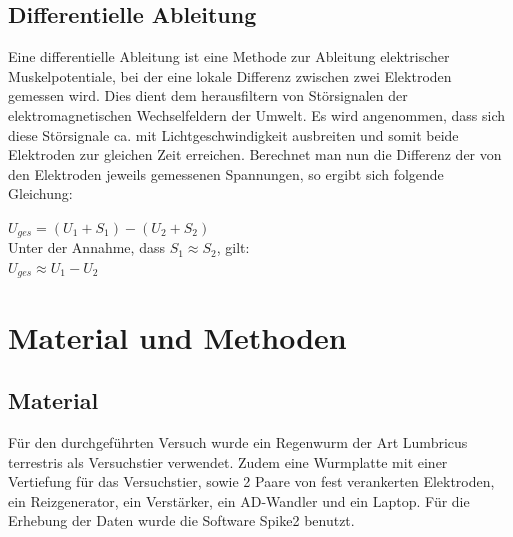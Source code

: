 \documentclass[11pt]{article}
\begin{document}
\subsection{Differentielle Ableitung}\label{differentiell}
Eine differentielle Ableitung ist eine Methode zur Ableitung elektrischer Muskelpotentiale, bei der eine lokale Differenz zwischen zwei Elektroden gemessen wird. Dies dient dem herausfiltern von Störsignalen der elektromagnetischen Wechselfeldern der Umwelt. Es wird angenommen, dass sich diese Störsignale ca. mit Lichtgeschwindigkeit ausbreiten und somit beide Elektroden zur gleichen Zeit erreichen. Berechnet man nun die Differenz der von den Elektroden jeweils gemessenen Spannungen, so ergibt sich folgende Gleichung:
\begin{center}
$U_{ges}= (U_1+S_1) - (U_2 + S_2)$ \\

Unter der Annahme, dass $S_1 \approx S_2$, gilt: \\

$U_{ges} \approx U_1 - U_2$
\end{center}




\section{Material und Methoden}
\subsection{Material}
Für den durchgeführten Versuch wurde ein Regenwurm der Art Lumbricus terrestris als Versuchstier verwendet. Zudem eine Wurmplatte mit einer Vertiefung für das Versuchstier, sowie 2 Paare von fest verankerten Elektroden, ein Reizgenerator, ein Verstärker, ein AD-Wandler und ein Laptop. Für die Erhebung der Daten wurde die Software Spike2 benutzt.
\end{document}
